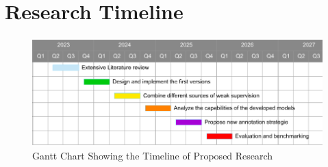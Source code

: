 \documentclass[11pt]{article}
\begin{document}
\section{Research Timeline}
\begin{figure}[h!]
\includegraphics[scale=0.75]{Gantt.png}
\centering
\caption{Gantt Chart Showing the Timeline of Proposed Research}
\label{chart}
\end{figure}
\end{document}
